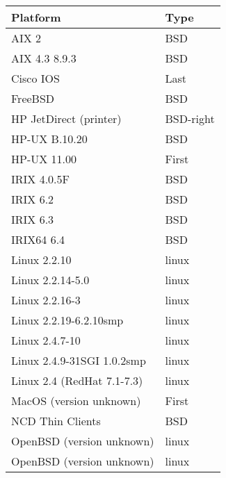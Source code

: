 \documentclass[english]{report}
\begin{document}
\begin{itemize}
\begin{itemize}
\begin{tabular}{| l | l |}
\hline
\textbf{Platform} & \textbf{Type}\\
\hline
\hline                     
                        AIX 2  & BSD \\
                        \hline
                AIX 4.3 8.9.3  & BSD \\
                        \hline
                    Cisco IOS  & Last \\
                        \hline
                      FreeBSD  & BSD\\
                        \hline 
       HP JetDirect (printer)  & BSD-right \\
                        \hline
                HP-UX B.10.20  & BSD \\
                        \hline
                  HP-UX 11.00  & First \\
                        \hline
                  IRIX 4.0.5F  & BSD \\
                        \hline
                     IRIX 6.2  & BSD \\
                        \hline
                     IRIX 6.3  & BSD \\
                        \hline
                   IRIX64 6.4  & BSD \\
                        \hline
                 Linux 2.2.10  & linux \\
                        \hline
             Linux 2.2.14-5.0  & linux \\
                        \hline
               Linux 2.2.16-3  & linux \\
                        \hline
       Linux 2.2.19-6.2.10smp  & linux \\
                        \hline
               Linux 2.4.7-10  & linux \\
                        \hline
   Linux 2.4.9-31SGI 1.0.2smp  & linux \\
                        \hline
   Linux 2.4 (RedHat 7.1-7.3)  & linux \\
                        \hline
      MacOS (version unknown)  & First \\
                        \hline
             NCD Thin Clients  & BSD \\
                        \hline
    OpenBSD (version unknown)  & linux \\
                        \hline
    OpenBSD (version unknown)  & linux \\

\end{tabular}
\end{itemize}
\end{itemize}
\end{document}
